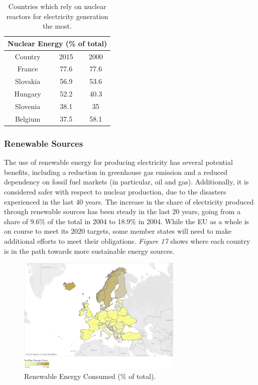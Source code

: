 \documentclass{book}
\begin{document}
\bigskip
\begin{table}[H]
\begin{center}
\begin{tabular}{|c|c|c|}
\hline
\multicolumn{3}{|c|}{Nuclear Energy (\% of total)}\\
\hline
Country & 2015 & 2000 \\
\hline
France & 77.6 & 77.6 \\
Slovakia & 56.9 & 53.6 \\
Hungary & 52.2 & 40.3 \\
Slovenia & 38.1 & 35 \\
Belgium & 37.5 & 58.1\\
\hline
\end{tabular}
\caption{Countries which rely on nuclear reactors for electricity generation the most.}
\end{center}
\end{table}

\subsubsection*{Renewable Sources}

The use of renewable energy for producing electricity has several potential benefits, including a reduction in greenhouse gas emission and a reduced dependency on fossil fuel markets (in particular, oil and gas). Additionally, it is considered safer with respect to nuclear production, due to the disasters experienced in the last 40 years. The increase in the share of electricity produced through renewable sources has been steady in the last 20 years, going from a share of 9.6\% of the total in 2004 to 18.9\% in 2004. While the EU as a whole is on course to meet its 2020 targets, some member states will need to make additional efforts to meet their obligations.
\textit{Figure 17} shows where each country is in the path towards more sustainable energy sources.

\bigskip
\begin{figure}[H]
\begin{center}
\captionsetup{justification=centering}
\includegraphics[width=0.7\textwidth]{Images/ren.png}
\caption{Renewable Energy Consumed (\% of total). }
\end{center}
\end{figure}
\bigskip
\end{document}
